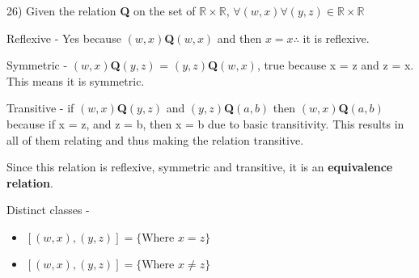 \documentclass[11pt]{article}
\begin{document}
\begin{flushleft}
\hrulefill

26) Given the relation \textbf{Q} on the set of $\mathbb{R}\times \mathbb{R}$, $\forall (w,x) \forall (y,z) \in \mathbb{R}\times \mathbb{R}$ 

\vspace{2mm}

Reflexive - Yes because $(w,x)$\textbf{Q}$(w,x)$ and then $x = x \therefore$ it is reflexive.

\vspace{2mm}

Symmetric - $(w,x)$\textbf{Q}$(y,z)$ = $(y,z)$\textbf{Q}$(w,x)$, true because x = z and z = x. This means it is symmetric.

\vspace{2mm}

Transitive - if $(w,x)$\textbf{Q}$(y,z)$ and $(y,z)$\textbf{Q}$(a,b)$ then $(w,x)$\textbf{Q}$(a,b)$ because if x = z, and z = b, then x = b due to basic transitivity. This results in all of them relating and thus making the relation transitive.

Since this relation is reflexive, symmetric and transitive, it is an \textbf{equivalence relation}.

Distinct classes - 

\begin{itemize}
\item $[(w,x),(y,z)] =\{\text{Where }x=z\} $
\item $[(w,x),(y,z)] =\{\text{Where }x\neq z\} $
\end{itemize}

\hrulefill
\end{flushleft}
\end{document}
